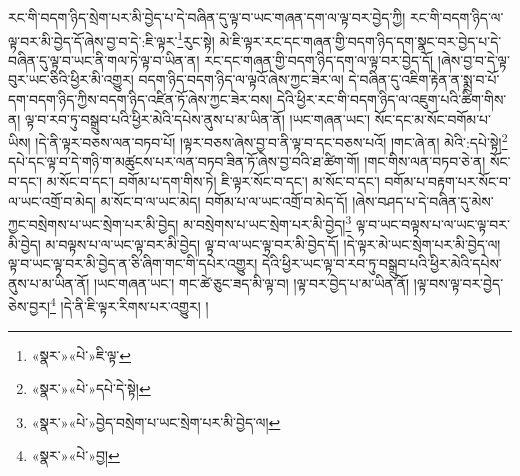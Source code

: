 རང་གི་བདག་ཉིད་སྲེག་པར་མི་བྱེད་པ་དེ་བཞིན་དུ་ལྟ་བ་ཡང་གཞན་དག་ལ་ལྟ་བར་བྱེད་ཀྱི། རང་གི་བདག་ཉིད་ལ་ལྟ་བར་མི་བྱེད་དོ་ཞེས་བྱ་བ་དེ་:ཇི་ལྟར་\footnote{«སྣར་»«པེ་»ཇི་ལྟ་}རུང་སྟེ། མེ་ཇི་ལྟར་རང་དང་གཞན་གྱི་བདག་ཉིད་དག་སྣང་བར་བྱེད་པ་དེ་བཞིན་དུ་ལྟ་བ་ཡང་ནི་གལ་ཏེ་ལྟ་བ་ཡིན་ན། རང་དང་གཞན་གྱི་བདག་ཉིད་དག་ལ་ལྟ་བར་བྱེད་དོ། །ཞེས་བྱ་བ་དེ་ལྟ་བུར་ཡང་ཅིའི་ཕྱིར་མི་འགྱུར། བདག་ཉིད་བདག་ཉིད་ལ་ལྟའོ་ཞེས་ཀྱང་ཟེར་ལ། དེ་བཞིན་དུ་འཇིག་རྟེན་ན་སྨྲ་བ་པོ་དག་བདག་ཉིད་ཀྱིས་བདག་ཉིད་འཛིན་ཏོ་ཞེས་ཀྱང་ཟེར་བས། དེའི་ཕྱིར་རང་གི་བདག་ཉིད་ལ་འཇུག་པའི་ཚིག་གིས་ན། ལྟ་བ་རབ་ཏུ་བསྒྲུབ་པའི་ཕྱིར་མེའི་དཔེས་ནུས་པ་མ་ཡིན་ནོ། །ཡང་གཞན་ཡང་། སོང་དང་མ་སོང་བགོམ་པ་ཡིས། །དེ་ནི་ལྟར་བཅས་ལན་བཏབ་པོ། །ལྟར་བཅས་ཞེས་བྱ་བ་ནི་ལྟ་བ་དང་བཅས་པའོ། །གང་ཞེ་ན། མེའི་:དཔེ་སྟེ།\footnote{«སྣར་»«པེ་»དཔེ་དེ་སྟེ།} དཔེ་དང་ལྟ་བ་དེ་གཉི་ག་མཚུངས་པར་ལན་བཏབ་ཟིན་ཏོ་ཞེས་བྱ་བའི་ཐ་ཚིག་གོ། །གང་གིས་ལན་བཏབ་ཅེ་ན། སོང་བ་དང་། མ་སོང་བ་དང་། བགོམ་པ་དག་གིས་ཏེ། ཇི་ལྟར་སོང་བ་དང་། མ་སོང་བ་དང་། བགོམ་པ་བརྟག་པར་སོང་བ་ལ་ཡང་འགྲོ་བ་མེད། མ་སོང་བ་ལ་ཡང་མེད། བགོམ་པ་ལ་ཡང་འགྲོ་བ་མེད་དོ། །ཞེས་བཤད་པ་དེ་བཞིན་དུ་མེས་ཀྱང་བསྲེགས་པ་ཡང་སྲེག་པར་མི་བྱེད། མ་བསྲེགས་པ་ཡང་སྲེག་པར་མི་བྱེད།\footnote{«སྣར་»«པེ་»བྱེད་བསྲེག་པ་ཡང་སྲེག་པར་མི་བྱེད་ལ།} ལྟ་བ་ཡང་བལྟས་པ་ལ་ཡང་ལྟ་བར་མི་བྱེད། མ་བལྟས་པ་ལ་ཡང་ལྟ་བར་མི་བྱེད། ལྟ་བ་ལ་ཡང་ལྟ་བར་མི་བྱེད་དོ། །དེ་ལྟར་མེ་ཡང་སྲེག་པར་མི་བྱེད་ལ། ལྟ་བ་ཡང་ལྟ་བར་མི་བྱེད་ན་ཅི་ཞིག་གང་གི་དཔེར་འགྱུར། དེའི་ཕྱིར་ཡང་ལྟ་བ་རབ་ཏུ་བསྒྲུབ་པའི་ཕྱིར་མེའི་དཔེས་ནུས་པ་མ་ཡིན་ནོ། །ཡང་གཞན་ཡང་། གང་ཚེ་ཅུང་ཟད་མི་ལྟ་བ། །ལྟ་བར་བྱེད་པ་མ་ཡིན་ནོ། །ལྟ་བས་ལྟ་བར་བྱེད་ཅེས་བྱར།\footnote{«སྣར་»«པེ་»བྱ།} །དེ་ནི་ཇི་ལྟར་རིགས་པར་འགྱུར། །
